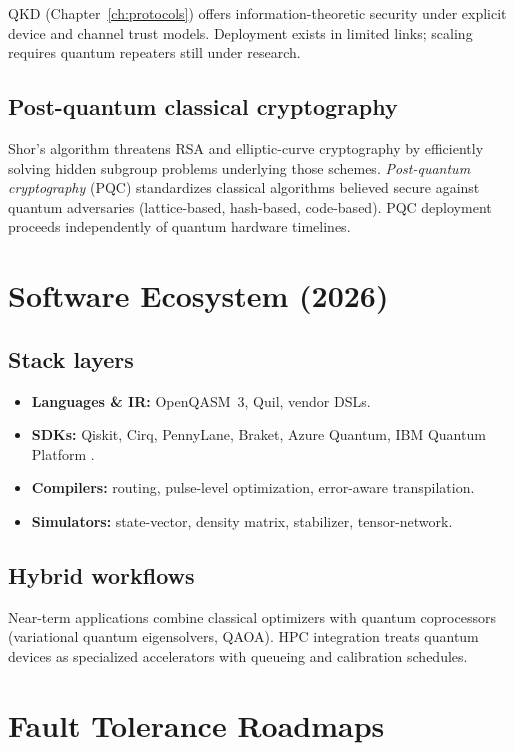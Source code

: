 QKD (Chapter~\ref{ch:protocols}) offers information-theoretic security under explicit device and channel trust models. Deployment exists in limited links; scaling requires quantum repeaters still under research.

\subsection{Post-quantum classical cryptography}

Shor's algorithm threatens RSA and elliptic-curve cryptography by efficiently solving hidden subgroup problems underlying those schemes. \emph{Post-quantum cryptography} (PQC) standardizes classical algorithms believed secure against quantum adversaries (lattice-based, hash-based, code-based). PQC deployment proceeds independently of quantum hardware timelines.

\section{Software Ecosystem (2026)}
\label{sec:software-ecosystem}

\subsection{Stack layers}

\begin{itemize}[noitemsep]
\item \textbf{Languages \& IR:} OpenQASM~3, Quil, vendor DSLs.
\item \textbf{SDKs:} Qiskit, Cirq, PennyLane, Braket, Azure Quantum, IBM Quantum Platform \cite{ibm2026}.
\item \textbf{Compilers:} routing, pulse-level optimization, error-aware transpilation.
\item \textbf{Simulators:} state-vector, density matrix, stabilizer, tensor-network.
\end{itemize}

\subsection{Hybrid workflows}

Near-term applications combine classical optimizers with quantum coprocessors (variational quantum eigensolvers, QAOA). HPC integration treats quantum devices as specialized accelerators with queueing and calibration schedules.

\section{Fault Tolerance Roadmaps}
\label{sec:ft-roadmaps}

